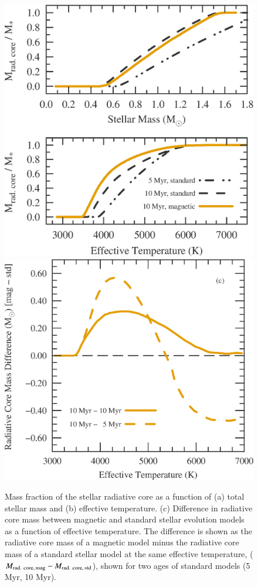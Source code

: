 \documentclass{aa}
\begin{document}
\begin{figure}[!ht]
    \centering
    \includegraphics[width=0.42\linewidth]{radiative_core_masses.eps} \qquad
    \includegraphics[width=0.48\linewidth]{radiative_core_mass_difference.eps}
    \caption{Mass fraction of the stellar radiative core as a function of (a) total stellar mass and (b) effective temperature. (c) Difference in radiative core mass between magnetic and standard stellar evolution models as a function of effective temperature. The difference is shown as the radiative core mass of a magnetic model minus the radiative core mass of a standard stellar model at the same effective temperature, ($M_{\rm rad.\ core,\, mag} - M_{\rm rad.\ core,\, std}$), shown for two ages of standard models (5 Myr, 10 Myr).}
    \label{fig:rad_core}
\end{figure}
\end{document}
